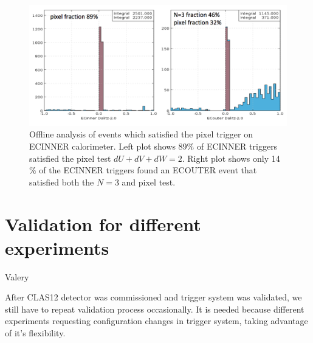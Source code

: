 \begin{figure}[!htb]
 \centering
  \includegraphics[width=1.0\columnwidth,keepaspectratio]{img/PixelFraction.png}
 \caption{Offline analysis of events which satisfied the pixel trigger on ECINNER calorimeter.  Left plot shows 89$\%$ of ECINNER triggers satisfied the pixel test $dU+dV+dW=2$.  Right plot shows only 14$\%$ of the ECINNER triggers found an ECOUTER event that satisfied both the $N=3$ and pixel test. }
\end{figure}






\section{Validation for different experiments} Valery

After CLAS12 detector was commissioned and trigger system was validated, we still have to repeat validation process occasionally. It is needed because different experiments requesting configuration changes in trigger system, taking advantage of it's flexibility.
